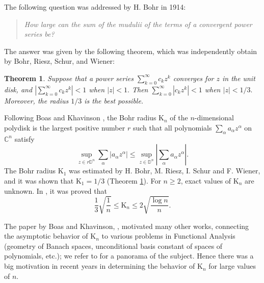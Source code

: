 \documentclass[10pt]{amsart}
\newtheorem{theorem}{Theorem}[section]
\numberwithin{equation}{section}
\begin{document}
The following question was addressed by H. Bohr in 1914:

\begin{quote}
\emph{How large can the sum of the mudulii of the terms of a convergent
power series be?}
\end{quote}

\noindent The answer was given by the following theorem, which was
independently obtain by Bohr, Riesz, Schur, and Wiener:

\begin{theorem}
\label{th54} Suppose that a power series $\sum_{k=0}^{\infty }c_{k}z^{k}$
converges for $z $ in the unit disk, and $\left\vert \sum_{k=0}^{\infty
}c_{k}z^{k}\right\vert <1$ when $\left\vert z\right\vert <1.$ Then $\sum_{k=0}^{\infty }\left\vert c_{k}z^{k}\right\vert <1$ when $\left\vert
z\right\vert <1/3.$ Moreover, the radius $1/3$ is the best possible.
\end{theorem}

Following Boas and Khavinson \cite{BK97}, the Bohr radius $\mathrm{K}_{n}$
of the $n$-dimensional polydisk is the largest positive number $r$ such that
all polynomials $\sum_{\alpha }a_{\alpha }z^{\alpha }$ on $\mathbb{C}^{n}$
satisfy
\begin{equation*}
\sup_{z\in r\mathbb{D}^{n}}\sum_{\alpha }|a_{\alpha }z^{\alpha }|\leq
\sup_{z\in \mathbb{D}^{n}}\left\vert \sum_{\alpha }a_{\alpha }z^{\alpha
}\right\vert .
\end{equation*}The Bohr radius $\mathrm{K}_{1}$ was estimated by H. Bohr, M. Riesz, I.
Schur and F. Wiener, and it was shown that $\mathrm{K}_{1}=1/3$ (Theorem \ref{th54}). For $n\geq 2$, exact values of $\mathrm{K}_{n}$ are unknown. In
\cite{BK97}, it was proved that\begin{equation}
\frac{1}{3}\sqrt{\frac{1}{n}}\leq \mathrm{K}_{n}\leq 2\sqrt{\frac{\log n}{n}}.  \label{9788}
\end{equation}

The paper by Boas and Khavinson, \cite{BK97}, motivated many other works,
connecting the asymptotic behavior of $\mathrm{K}_{n}$ to various problems
in Functional Analysis (geometry of Banach spaces, unconditional basis
constant of spaces of polynomials, etc.); we refer to \cite{DP06} for a
panorama of the subject. Hence there was a big motivation in recent years in
determining the behavior of $\mathrm{K}_{n}$ for large values of $n$.
\end{document}
